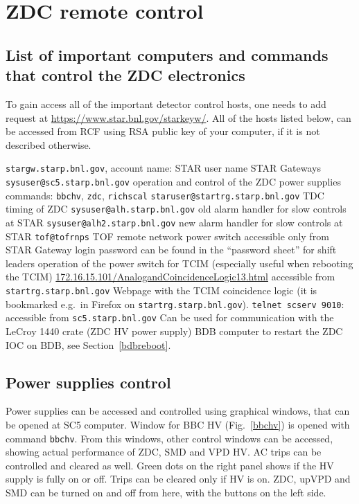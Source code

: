 
\chapter{ZDC remote control}
\section{\label{computers}List of important computers and commands that control the ZDC electronics}

To gain access all of the important detector control hosts, one needs to add request at \url{https://www.star.bnl.gov/starkeyw/}. All of the hosts listed below, can be accessed from RCF using RSA public key of your computer, if it is not described otherwise.
\begin{outline}
 \1 \texttt{stargw.starp.bnl.gov}, account name: STAR user name
   \2 STAR Gateways
 \1 \texttt{sysuser@sc5.starp.bnl.gov} 
   \2 operation and control of the ZDC power supplies
   \2 commands: \texttt{bbchv}, \texttt{zdc}, \texttt{richscal}
 \1 \texttt{staruser@startrg.starp.bnl.gov}
   \2 TDC timing of ZDC
 \1 \texttt{sysuser@alh.starp.bnl.gov} 
   \2 old alarm handler for slow controls at STAR
 \1 \texttt{sysuser@alh2.starp.bnl.gov}
   \2 new alarm handler for slow controls at STAR
 \1 \texttt{tof@tofrnps}
   \2 TOF remote network power switch
   \2 accessible only from STAR Gateway
   \2 login password can be found in the ``password sheet'' for shift leaders
   \2 operation of the power switch for TCIM (especially useful when rebooting the TCIM)
 \1 \url{172.16.15.101/AnalogandCoincidenceLogic13.html}
   \2 accessible from \texttt{startrg.starp.bnl.gov}
   \2 Webpage with the TCIM coincidence logic (it is bookmarked e.g.\ in Firefox on \texttt{startrg.starp.bnl.gov}).
 \1 \texttt{telnet scserv 9010}: 
   \2 accessible  from \texttt{sc5.starp.bnl.gov}
   \2 Can be used for communication with the LeCroy 1440 crate (ZDC HV power supply)
   \2 BDB computer
   \2 to restart the ZDC IOC on BDB, see Section~\ref{bdbreboot}.
\end{outline}


\section{Power supplies control}
Power supplies can be accessed and controlled using graphical windows, that can be opened at SC5 computer. 
Window for BBC HV (Fig.~\ref{bbchv}) is opened with command \texttt{bbchv}. From this windows, other control windows can be accessed, showing actual performance of ZDC, SMD and VPD HV\@. AC trips can be controlled and cleared as well. Green dots on the right panel shows if the HV supply is fully on or off. Trips can be cleared only if HV is on. ZDC, upVPD and SMD can be turned on and off from here, with the buttons on the left side.

